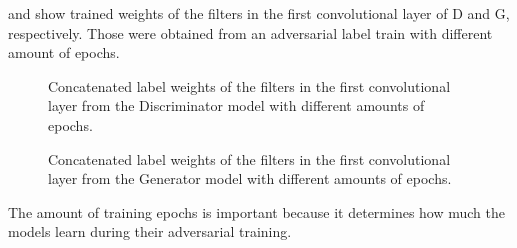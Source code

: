 \FloatBarrier
\noindent
{} and  show trained weights of the filters in the first convolutional layer of D and G, respectively.
Those were obtained from an adversarial label train with different amount of epochs.
\begin{figure}[!ht]
  \centering
  \caption{Concatenated label weights of the filters in the first convolutional layer from the Discriminator model with different amounts of epochs.}
  \label{fig:nn_adv_label_weights_d}
\end{figure}
\FloatBarrier
\noindent
\begin{figure}[!ht]
  \centering
  \caption{Concatenated label weights of the filters in the first convolutional layer from the Generator model with different amounts of epochs.}
  \label{fig:nn_adv_label_weights_g}
\end{figure}
\FloatBarrier
\noindent
The amount of training epochs is important because it determines how much the models learn during their adversarial training.
